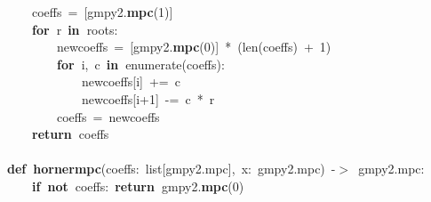 \documentclass{article}\usepackage[]{graphicx}\usepackage[dvipsnames,table]{xcolor}
\makeatletter
\newcommand{\hlnum}[1]{\textcolor[rgb]{0.686,0.059,0.569}{#1}}%
\newcommand{\hlopt}[1]{\textcolor[rgb]{0,0,0}{#1}}%
\newcommand{\hldef}[1]{\textcolor[rgb]{0.345,0.345,0.345}{#1}}%
\newcommand{\hlkwa}[1]{\textcolor[rgb]{0.161,0.373,0.58}{\textbf{#1}}}%
\newcommand{\hlkwb}[1]{\textcolor[rgb]{0.69,0.353,0.396}{#1}}%
\newcommand{\hlkwd}[1]{\textcolor[rgb]{0.737,0.353,0.396}{\textbf{#1}}}%
\newenvironment{kframe}{%
 \def\at@end@of@kframe{}%
 \ifinner\ifhmode%
  \def\at@end@of@kframe{\end{minipage}}%
  \begin{minipage}{\columnwidth}%
 \fi\fi%
 \def\FrameCommand##1{\hskip\@totalleftmargin \hskip-\fboxsep
 \colorbox{shadecolor}{##1}\hskip-\fboxsep
     \hskip-\linewidth \hskip-\@totalleftmargin \hskip\columnwidth}%
 \MakeFramed {\advance\hsize-\width
   \@totalleftmargin\z@ \linewidth\hsize
   \@setminipage}}%
 {\par\unskip\endMakeFramed%
 \at@end@of@kframe}
\newenvironment{knitrout}{}{} %
\makeatother
\begin{document}
\begin{center}
\begin{minipage}[m]{15cm}
\begin{knitrout}
\begin{kframe}
\hldef{}\hldef{\ \ \ \ }\hldef{coeffs\ }\hlopt{=\ {[}}\hldef{gmpy2}\hlopt{.}\hldef{}\hlkwd{mpc}\hldef{}\hlopt{(}\hldef{}\hlnum{1}\hldef{}\hlopt{){]}}\hspace*{\fill}\\
\hldef{}\hldef{\ \ \ \ }\hldef{}\hlkwa{for\ }\hldef{r\ }\hlkwa{in\ }\hldef{roots}\hlopt{:}\hspace*{\fill}\\
\hldef{}\hldef{\ \ \ \ \ \ \ \ }\hldef{new\textunderscore coeffs\ }\hlopt{=\ {[}}\hldef{gmpy2}\hlopt{.}\hldef{}\hlkwd{mpc}\hldef{}\hlopt{(}\hldef{}\hlnum{0}\hldef{}\hlopt{){]}\ {*}\ (}\hldef{}\hlkwb{len}\hldef{}\hlopt{(}\hldef{coeffs}\hlopt{)\ +\ }\hldef{}\hlnum{1}\hldef{}\hlopt{)}\hspace*{\fill}\\
\hldef{}\hldef{\ \ \ \ \ \ \ \ }\hldef{}\hlkwa{for\ }\hldef{i}\hlopt{,\ }\hldef{c\ }\hlkwa{in\ }\hldef{}\hlkwb{enumerate}\hldef{}\hlopt{(}\hldef{coeffs}\hlopt{):}\hspace*{\fill}\\
\hldef{}\hldef{\ \ \ \ \ \ \ \ \ \ \ \ }\hldef{new\textunderscore coeffs}\hlopt{{[}}\hldef{i}\hlopt{{]}\ +=\ }\hldef{c}\hspace*{\fill}\\
\hldef{}\hldef{\ \ \ \ \ \ \ \ \ \ \ \ }\hldef{new\textunderscore coeffs}\hlopt{{[}}\hldef{i}\hlopt{+}\hldef{}\hlnum{1}\hldef{}\hlopt{{]}\ {-}=\ }\hldef{c\ }\hlopt{{*}\ }\hldef{r}\hspace*{\fill}\\
\hldef{}\hldef{\ \ \ \ \ \ \ \ }\hldef{coeffs\ }\hlopt{=\ }\hldef{new\textunderscore coeffs}\hspace*{\fill}\\
\hldef{}\hldef{\ \ \ \ }\hldef{}\hlkwa{return\ }\hldef{coeffs}\hspace*{\fill}\\
\hldef{}\hspace*{\fill}\\
\hldef{}\hlkwa{def\ }\hldef{}\hlkwd{horner\textunderscore mpc}\hldef{}\hlopt{(}\hldef{coeffs}\hlopt{:\ }\hldef{}\hlkwb{list}\hldef{}\hlopt{{[}}\hldef{gmpy2}\hlopt{.}\hldef{mpc}\hlopt{{]},\ }\hldef{x}\hlopt{:\ }\hldef{gmpy2}\hlopt{.}\hldef{mpc}\hlopt{)\ {-}$>$\ }\hldef{gmpy2}\hlopt{.}\hldef{mpc}\hlopt{:}\hspace*{\fill}\\
\hldef{}\hldef{\ \ \ \ }\hldef{}\hlkwa{if\ not\ }\hldef{coeffs}\hlopt{:\ }\hldef{}\hlkwa{return\ }\hldef{gmpy2}\hlopt{.}\hldef{}\hlkwd{mpc}\hldef{}\hlopt{(}\hldef{}\hlnum{0}\hldef{}\hlopt{)}\hspace*{\fill}\\

\end{kframe}
\end{knitrout}
\end{minipage}
\end{center}
\end{document}
